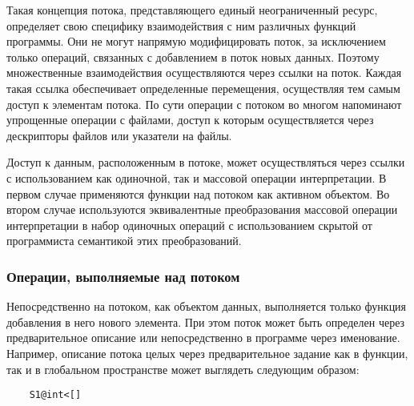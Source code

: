 Такая концепция потока, представляющего единый неограниченный ресурс, определяет свою специфику взаимодействия с ним различных функций программы. Они не могут напрямую модифицировать поток, за исключением только операций, связанных с добавлением в поток новых данных. Поэтому множественные взаимодействия осуществляются через ссылки на поток. Каждая такая ссылка обеспечивает определенные перемещения, осуществляя тем самым доступ к элементам потока. По сути операции с потоком во многом напоминают упрощенные операции с файлами, доступ к которым осуществляется через дескрипторы файлов или указатели на файлы.


Доступ к данным, расположенным в потоке, может осуществляться через ссылки с использованием как одиночной, так и массовой операции интерпретации. В первом случае применяются функции над потоком как активном объектом. Во втором случае используются эквивалентные преобразования массовой операции интерпретации в набор одиночных операций с использованием скрытой от программиста семантикой этих преобразований.

\subsubsection{Операции, выполняемые над потоком}


Непосредственно на потоком, как объектом данных, выполняется только функция добавления в него нового элемента. При этом поток может быть определен через предварительное описание или непосредственно в программе через именование. Например, описание потока целых через предварительное задание как в функции, так и в глобальном пространстве может выглядеть следующим образом:
\begin{verbatim}
    S1@int<[]
\end{verbatim}

